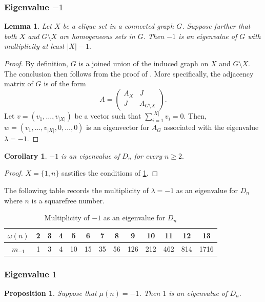 \documentclass[11pt,a4paper]{amsart}
\newtheorem{prop}[thm]{Proposition}
\newtheorem{lem}[thm]{Lemma}
\newtheorem{cor}[thm]{Corollary}
\theoremstyle{definition}
\numberwithin{equation}{section}
\newcommand{\ones}{J}
\begin{document}
\subsubsection{Eigenvalue $-1$}
\begin{lem} \label{lem:clique_1}
    Let $X$ be a clique set in a connected graph $G$. Suppose further that both $X$ and $G \setminus X$ are homogeneous sets in $G.$ Then $-1$ is an eigenvalue of $G$ with multiplicity at least $|X|-1.$
\end{lem}
\begin{proof}
By definition, $G$ is a joined union of the induced graph on $X$ and $G \setminus X.$  The conclusion then follows from the proof of \cite[Proposition 3.1]{join_graphs}. More specifically, the adjacency matrix of $G$ is of the form 
\[ A= \begin{pmatrix}
A_{X}& \ones \\ \ones & A_{G \setminus X}
\end{pmatrix} .\] 
Let $v=(v_1, \ldots, v_{|X|})$ be a vector such that $\sum_{i=1}^{|X|}v_i=0.$ Then, $w = (v_1, \ldots, v_{|X|}, 0 , \ldots, 0)$ is an eigenvector for $A_G$ associated with the eigenvalue $\lambda=-1.$
\end{proof}

\begin{cor}
    $-1$ is an eigenvalue of $D_n$ for every $n \geq 2.$
\end{cor}

\begin{proof}
    $X=\{1, n\}$ sastifies the conditions of \cref{lem:clique_1}.
\end{proof}

The following table records the multiplicity of $\lambda=-1$ as an eigenvalue for $D_n$ where $n$ is a squarefree number. 
\begin{table}[h]

\begin{tabular}{|c|c|c|c|c|c|c|c|c|c|c|c|c|}
\hline
$\omega(n)$ &2 & 3 & 4 & 5 & 6 & 7 & 8 & 9 & 10 & 11 & 12 & 13 \\
\hline
$m_{-1}$ &1 & 3 & 4 & 10 & 15 & 35 & 56 & 126 & 212 & 462 & 814 & 1716 \\
\hline
\end{tabular}
\caption{Multiplicity of $-1$ as an eigenvalue for $D_n$}
\end{table}



 \subsubsection{Eigenvalue $1$}
 \begin{prop}
    Suppose that $\mu(n)=-1$. Then $1$ is an eigenvalue of $D_n.$
 \end{prop}
\end{document}
